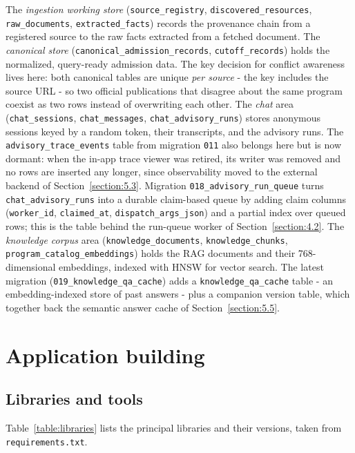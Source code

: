\documentclass[../main.tex]{subfiles}
\begin{document}
The \textit{ingestion working store} (\texttt{source\_registry}, \texttt{discovered\_resources}, \texttt{raw\_documents}, \texttt{extracted\_facts}) records the provenance chain from a registered source to the raw facts extracted from a fetched document.
The \textit{canonical store} (\texttt{canonical\_admission\_records}, \texttt{cutoff\_records}) holds the normalized, query-ready admission data.
The key decision for conflict awareness lives here: both canonical tables are unique \textit{per source} - the key includes the source \gls{URL} - so two official publications that disagree about the same program coexist as two rows instead of overwriting each other.
The \textit{chat} area (\texttt{chat\_sessions}, \texttt{chat\_messages}, \texttt{chat\_advisory\_runs}) stores anonymous sessions keyed by a random token, their transcripts, and the advisory runs.
The \texttt{advisory\_trace\_events} table from migration \texttt{011} also belongs here but is now dormant: when the in-app trace viewer was retired, its writer was removed and no rows are inserted any longer, since observability moved to the external backend of Section~\ref{section:5.3}.
Migration \texttt{018\_advisory\_run\_queue} turns \texttt{chat\_advisory\_runs} into a durable claim-based queue by adding claim columns (\texttt{worker\_id}, \texttt{claimed\_at}, \texttt{dispatch\_args\_json}) and a partial index over queued rows; this is the table behind the run-queue worker of Section~\ref{section:4.2}.
The \textit{knowledge corpus} area (\texttt{knowledge\_documents}, \texttt{knowledge\_chunks}, \texttt{program\_catalog\_embeddings}) holds the \gls{RAG} documents and their 768-dimensional embeddings, indexed with \gls{HNSW} for vector search.
The latest migration (\texttt{019\_knowledge\_qa\_cache}) adds a \texttt{knowledge\_qa\_cache} table - an embedding-indexed store of past answers - plus a companion version table, which together back the semantic answer cache of Section~\ref{section:5.5}.

\section{Application building}
\label{section:4.3}

\subsection{Libraries and tools}

Table~\ref{table:libraries} lists the principal libraries and their versions, taken from \texttt{requirements.txt}.
\end{document}
